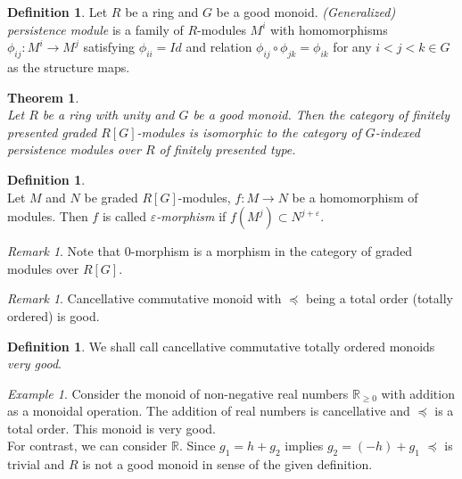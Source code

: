 \documentclass[a4paper, 12pt]{article}
\newcounter{stmcounter}[section]
\newcounter{thcounter}
\numberwithin{equation}{section}
\newtheorem{theorem}[thcounter]{Theorem}
\theoremstyle{definition}
\newtheorem{definition}[stmcounter]{Definition}
\theoremstyle{remark}
\newtheorem{remark}[stmcounter]{Remark}
\newtheorem{example}[stmcounter]{Example}
\newcommand{\define}[1]{{\textit{#1}}}
\renewcommand{\geq}{\geqslant}
\begin{document}
\begin{definition} {\cite[Definition 12]{Corbet18}}
  Let $R$ be a ring and $G$ be a good monoid. \define{(Generalized) persistence module} is a family of $R$-modules $M^i$ with homomorphisms $\phi_{ij} : M^i \to M^{j}$ satisfying $\phi_{ii} = Id$ and relation $\phi_{ij} \circ \phi_{jk} = \phi_{ik}$ for any $i < j < k \in G$ as the structure maps.
\end{definition}

\begin{theorem} {\cite[Theorem 21]{Corbet18}}\\
  Let $R$ be a ring with unity and $G$ be a good monoid. Then the category of finitely presented graded $R[G]$-modules is isomorphic to the category of $G$-indexed persistence modules over $R$ of finitely presented type.
\end{theorem}

\begin{definition} {\cite[Definition 2.7]{GS16}}\\
  Let $M$ and $N$ be graded $R[G]$-modules, $f : M \to N$ be a homomorphism of modules. Then $f$ is called \define{$\varepsilon$-morphism} if $f(M^j) \subset N^{j+\varepsilon}$.
\end{definition}

\begin{remark}
  Note that $0$-morphism is a morphism in the category of graded modules over $R[G]$.
\end{remark}

\begin{remark}
  Cancellative commutative monoid with $\preceq$ being a total order (totally ordered) is good.
\end{remark}

\begin{definition}
  We shall call cancellative commutative totally ordered monoids \define{very good}.
\end{definition}

\begin{example}
  Consider the monoid of non-negative real numbers $\mathbb{R}_{\geq 0}$ with addition as a monoidal operation. The addition of real numbers is cancellative and $\preceq$ is a total order. This monoid is very good.\\

  For contrast, we can consider $\mathbb{R}$. Since $g_1 = h + g_2$ implies $g_2 = (-h) + g_1$ $\preceq$ is trivial and $R$ is not a good monoid in sense of the given definition.
\end{example} ~ \par
\end{document}
